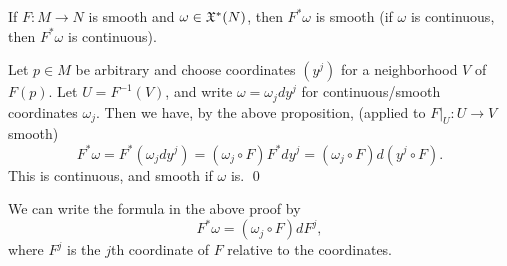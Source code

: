 \eproof

\bprop

    If $F\colon M\to N$ is smooth and $\omega\in{\frak X}^*(N)$, then $F^*\omega$ is smooth (if $\omega$ is continuous, then $F^*\omega$ is continuous).

\eprop

\bproof

    Let $p\in M$ be arbitrary and choose coordinates $(y^j)$ for a neighborhood $V$ of $F(p)$.
    Let $U=F^{-1}(V)$, and write $\omega=\omega_jdy^j$ for continuous/smooth coordinates $\omega_j$.
    Then we have, by the above proposition, (applied to $F|_U\colon U\to V$ smooth)
    $$ F^*\omega = F^*(\omega_jdy^j) = (\omega_j\circ F)F^*dy^j = (\omega_j\circ F)d(y^j\circ F) . $$
    This is continuous, and smooth if $\omega$ is.
    \qed

\eproof

We can write the formula in the above proof by
$$ F^*\omega = (\omega_j\circ F)dF^j, $$
where $F^j$ is the $j$th coordinate of $F$ relative to the coordinates.

